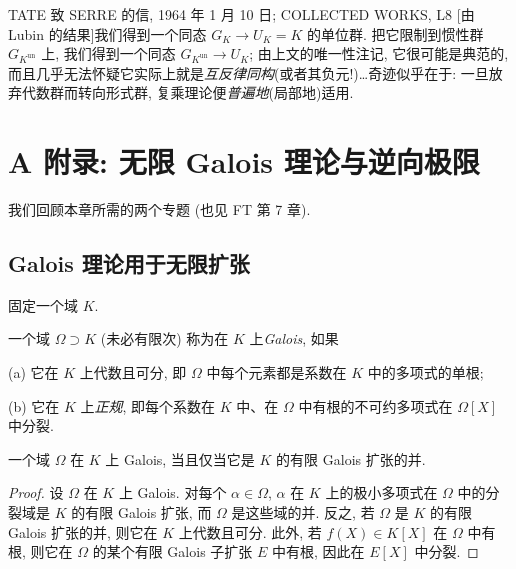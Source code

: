 \begin{namedblock}{TATE 致 SERRE 的信, 1964 年 1 月 10 日; COLLECTED WORKS, L8}
[由 Lubin 的结果]我们得到一个同态 $G_{K}\to U_{K}=K$ 的单位群. 把它限制到惯性群 $G_{K^{\mathrm{un}}}$ 上, 我们得到一个同态 $G_{K^{\mathrm{un}}}\to U_{K}$; 由上文的唯一性注记, 它很可能是典范的, 而且几乎无法怀疑它实际上就是\emph{互反律同构}(或者其负元!)\ldots 奇迹似乎在于: 一旦放弃代数群而转向形式群, 复乘理论便\emph{普遍地}(局部地)适用.
\end{namedblock}

\section*{A 附录: 无限 Galois 理论与逆向极限}\label{sec:I.A}%

我们回顾本章所需的两个专题 (也见 FT 第 7 章).

\renewcommand{\thetheorem}{A.\arabic{theorem}}
\setcounter{theorem}{0}

\subsection*{Galois 理论用于无限扩张}

固定一个域 $K$.

\begin{definition}\label{def:A.1}
一个域 $\Omega\supset K$ (未必有限次) 称为在 $K$ 上\emph{Galois}, 如果

(a) 它在 $K$ 上代数且可分, 即 $\Omega$ 中每个元素都是系数在 $K$ 中的多项式的单根;

(b) 它在 $K$ 上\emph{正规}, 即每个系数在 $K$ 中、在 $\Omega$ 中有根的不可约多项式在 $\Omega[X]$ 中分裂.
\end{definition}

\begin{proposition}\label{prop:A.2}
一个域 $\Omega$ 在 $K$ 上 Galois, 当且仅当它是 $K$ 的有限 Galois 扩张的并.
\end{proposition}

\begin{proof}
设 $\Omega$ 在 $K$ 上 Galois. 对每个 $\alpha\in\Omega$, $\alpha$ 在 $K$ 上的极小多项式在 $\Omega$ 中的分裂域是 $K$ 的有限 Galois 扩张, 而 $\Omega$ 是这些域的并. 反之, 若 $\Omega$ 是 $K$ 的有限 Galois 扩张的并, 则它在 $K$ 上代数且可分. 此外, 若 $f(X)\in K[X]$ 在 $\Omega$ 中有根, 则它在 $\Omega$ 的某个有限 Galois 子扩张 $E$ 中有根, 因此在 $E[X]$ 中分裂.
\end{proof}


